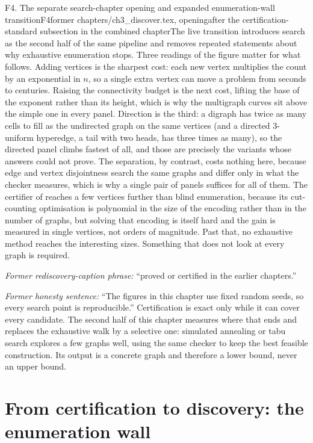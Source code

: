 \begin{offcutrewrite}{F4. The separate search-chapter opening and expanded enumeration-wall transition}{F4}{former chapters/ch3\_discover.tex, opening}{after the certification-standard subsection in the combined chapter}{The live transition introduces search as the second half of the same pipeline and removes repeated statements about why exhaustive enumeration stops.}
Three readings of the figure matter for what follows. Adding vertices is the sharpest cost: each new vertex multiplies the count by an exponential in $n$, so a single extra vertex can move a problem from seconds to centuries. Raising the connectivity budget is the next cost, lifting the base of the exponent rather than its height, which is why the multigraph curves sit above the simple one in every panel. Direction is the third: a digraph has twice as many cells to fill as the undirected graph on the same vertices (and a directed $3$-uniform hyperedge, a tail with two heads, has three times as many), so the directed panel climbs fastest of all, and those are precisely the variants whose answers  could not prove. The separation, by contrast, costs nothing here, because edge and vertex disjointness search the same graphs and differ only in what the checker measures, which is why a single pair of panels suffices for all of them. The certifier of  reaches a few vertices further than blind enumeration, because its cut-counting optimisation is polynomial in the size of the encoding rather than in the number of graphs, but solving that encoding is itself hard and the gain is measured in single vertices, not orders of magnitude. Past that, no exhaustive method reaches the interesting sizes. Something that does not look at every graph is required.

\noindent\emph{Former rediscovery-caption phrase:} ``proved or certified in the earlier chapters.''

\noindent\emph{Former honesty sentence:} ``The figures in this chapter use fixed random seeds, so every search point is reproducible.''
\nowreads
Certification is exact only while it can cover every candidate. The second half of this chapter measures where that ends and replaces the exhaustive walk by a selective one: simulated annealing or tabu search explores a few graphs well, using the same checker to keep the best feasible construction. Its output is a concrete graph and therefore a lower bound, never an upper bound.

\section{From certification to discovery: the enumeration wall}


\end{offcutrewrite}
